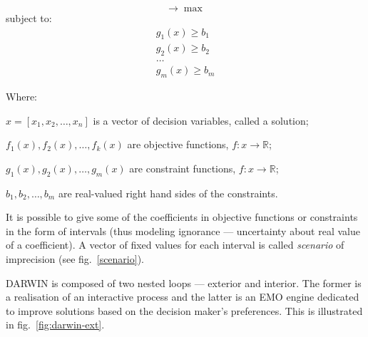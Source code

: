 \begin{equation}
[ f_1(x), f_2(x), \dots, f_k(x) ] \rightarrow  \max
\end{equation}
subject to:
\begin{equation}
\begin{array}{l}
g_1(x) \geq b_1 \\
g_2(x) \geq b_2 \\
\dots \\
g_m(x) \geq b_m
\end{array}
\end{equation}

Where:
\begin{description}
\item $x = [x_1, x_2, \dots, x_n]$ is a vector of decision variables, called a
  solution;
\item $f_1(x), f_2(x), \dots, f_k(x)$ are objective functions,
  $f: x \rightarrow \mathbb{R}$;
\item $g_1(x), g_2(x), \dots, g_m(x)$ are constraint functions,
  $f: x \rightarrow \mathbb{R}$;
\item $b_1, b_2, \dots, b_m$ are real-valued right hand sides of the
  constraints.
\end{description}

It is possible to give some of the coefficients in objective functions or
constraints in the form of intervals (thus modeling ignorance --- uncertainty
about real value of a coefficient). A vector of fixed values for each interval
is called \textit{scenario} of imprecision (see fig.~\ref{scenario}).

DARWIN is composed of two nested loops --- exterior and interior. The former
is a realisation of an interactive process and the latter is an EMO engine
dedicated to improve solutions based on the decision maker's preferences. This
is illustrated in fig.~\ref{fig:darwin-ext}.

